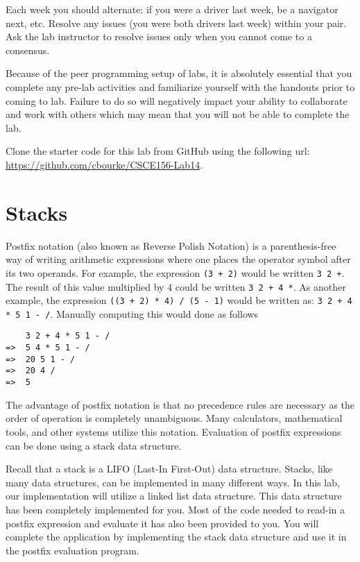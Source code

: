 \documentclass[12pt]{scrartcl}
\begin{document}
Each week you should alternate: if you were a driver last week, 
be a navigator next, etc.  Resolve any issues (you were both drivers
last week) within your pair.  Ask the lab instructor to resolve issues
only when you cannot come to a consensus.  

Because of the peer programming setup of labs, it is absolutely 
essential that you complete any pre-lab activities and familiarize
yourself with the handouts prior to coming to lab.  Failure to do
so will negatively impact your ability to collaborate and work with 
others which may mean that you will not be able to complete the
lab.  

Clone the starter code for this lab from GitHub using the following
url: \url{https://github.com/cbourke/CSCE156-Lab14}.

\section*{Stacks}

Postfix notation (also known as Reverse Polish Notation) is a 
parenthesis-free way of writing arithmetic expressions where one 
places the operator symbol after its two operands.  For example, 
the expression \texttt{(3 + 2)} would be written 
\texttt{3 2 +}.  The result of this value multiplied by 
4 could be written \texttt{3 2 + 4 *}.  As another example, 
the expression \texttt{((3 + 2) * 4) / (5 - 1)} would be
written as: \texttt{3 2 + 4 * 5 1 - /}.  Manually computing
this would done as follows

\begin{verbatim}
    3 2 + 4 * 5 1 - /
=>  5 4 * 5 1 - /
=>  20 5 1 - /
=>  20 4 /
=>  5
\end{verbatim}

The advantage of postfix notation is that no precedence rules are 
necessary as the order of operation is completely unambiguous.  
Many calculators, mathematical tools, and other systems utilize 
this notation.  Evaluation of postfix expressions can be done using 
a stack data structure.

Recall that a stack is a LIFO (Last-In First-Out) data structure.  
Stacks, like many data structures, can be implemented in many 
different ways.  In this lab, our implementation will utilize a 
linked list data structure.  This data structure has been completely 
implemented for you.  Most of the code needed to read-in a postfix 
expression and evaluate it has also been provided to you.  You will 
complete the application by implementing the stack data structure 
and use it in the postfix evaluation program.
\end{document}
